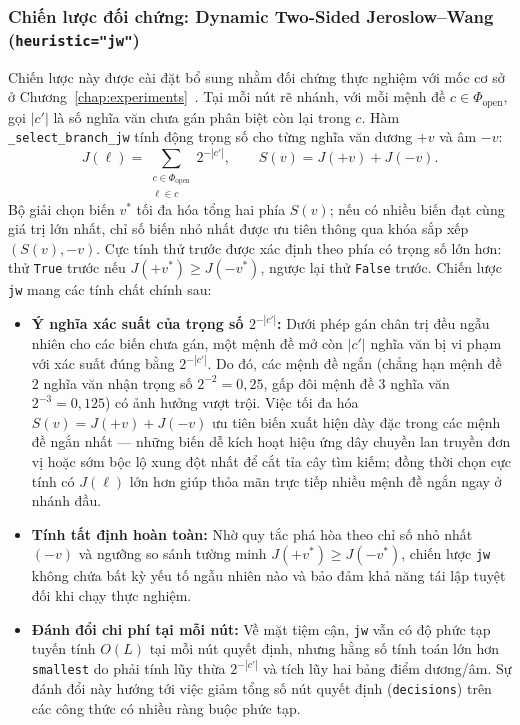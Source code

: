 \subsubsection{Chiến lược đối chứng: Dynamic Two-Sided Jeroslow--Wang (\texttt{heuristic="jw"})}
Chiến lược này được cài đặt bổ sung nhằm đối chứng thực nghiệm với mốc cơ sở ở Chương~\ref{chap:experiments}~\cite{jeroslow1990}. Tại mỗi nút rẽ nhánh, với mỗi mệnh đề $c \in \Phi_{\text{open}}$, gọi $|c'|$ là số nghĩa văn chưa gán phân biệt còn lại trong $c$. Hàm \texttt{\_select\_branch\_jw} tính động trọng số cho từng nghĩa văn dương $+v$ và âm $-v$:
\begin{equation}
    J(\ell) = \sum_{\substack{c \in \Phi_{\text{open}} \\ \ell \in c}} 2^{-|c'|}, \qquad S(v) = J(+v) + J(-v).
\end{equation}
Bộ giải chọn biến $v^*$ tối đa hóa tổng hai phía $S(v)$; nếu có nhiều biến đạt cùng giá trị lớn nhất, chỉ số biến nhỏ nhất được ưu tiên thông qua khóa sắp xếp $(S(v), -v)$. Cực tính thử trước được xác định theo phía có trọng số lớn hơn: thử \texttt{True} trước nếu $J(+v^*) \ge J(-v^*)$, ngược lại thử \texttt{False} trước. Chiến lược \texttt{jw} mang các tính chất chính sau:
\begin{itemize}
    \item \textbf{Ý nghĩa xác suất của trọng số $2^{-|c'|}$:} Dưới phép gán chân trị đều ngẫu nhiên cho các biến chưa gán, một mệnh đề mở còn $|c'|$ nghĩa văn bị vi phạm với xác suất đúng bằng $2^{-|c'|}$. Do đó, các mệnh đề ngắn (chẳng hạn mệnh đề $2$ nghĩa văn nhận trọng số $2^{-2} = 0{,}25$, gấp đôi mệnh đề $3$ nghĩa văn $2^{-3} = 0{,}125$) có ảnh hưởng vượt trội. Việc tối đa hóa $S(v) = J(+v) + J(-v)$ ưu tiên biến xuất hiện dày đặc trong các mệnh đề ngắn nhất --- những biến dễ kích hoạt hiệu ứng dây chuyền lan truyền đơn vị hoặc sớm bộc lộ xung đột nhất để cắt tỉa cây tìm kiếm; đồng thời chọn cực tính có $J(\ell)$ lớn hơn giúp thỏa mãn trực tiếp nhiều mệnh đề ngắn ngay ở nhánh đầu.
    \item \textbf{Tính tất định hoàn toàn:} Nhờ quy tắc phá hòa theo chỉ số nhỏ nhất $(-v)$ và ngưỡng so sánh tường minh $J(+v^*) \ge J(-v^*)$, chiến lược \texttt{jw} không chứa bất kỳ yếu tố ngẫu nhiên nào và bảo đảm khả năng tái lập tuyệt đối khi chạy thực nghiệm.
    \item \textbf{Đánh đổi chi phí tại mỗi nút:} Về mặt tiệm cận, \texttt{jw} vẫn có độ phức tạp tuyến tính $O(L)$ tại mỗi nút quyết định, nhưng hằng số tính toán lớn hơn \texttt{smallest} do phải tính lũy thừa $2^{-|c'|}$ và tích lũy hai bảng điểm dương/âm. Sự đánh đổi này hướng tới việc giảm tổng số nút quyết định (\texttt{decisions}) trên các công thức có nhiều ràng buộc phức tạp.
\end{itemize}

